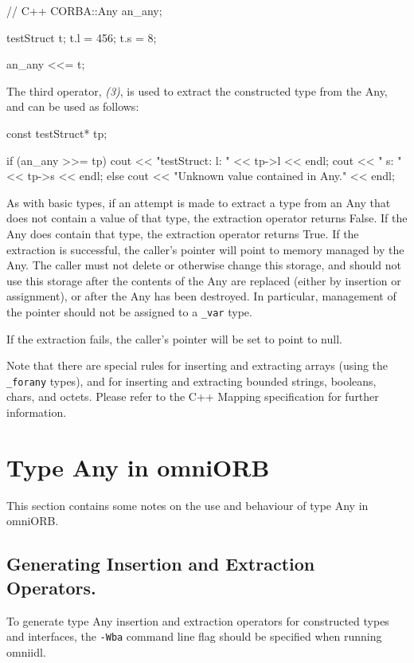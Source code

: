 \documentclass[11pt,twoside,a4paper]{book}
\newcommand{\type}[1]{\texttt{#1}}
\begin{document}
\begin{cxxlisting}
// C++
CORBA::Any an_any;

testStruct t;
t.l = 456;
t.s = 8;

an_any <<= t;
\end{cxxlisting}


The third operator, \emph{(3)}, is used to extract the constructed
type from the Any, and can be used as follows:

\begin{cxxlisting}
const testStruct* tp;

if (an_any >>= tp) {
    cout << "testStruct: l: " << tp->l << endl;
    cout << "            s: " << tp->s << endl;
}
else {
    cout << "Unknown value contained in Any." << endl;
}
\end{cxxlisting}

As with basic types, if an attempt is made to extract a type from an
Any that does not contain a value of that type, the extraction
operator returns False. If the Any does contain that type, the
extraction operator returns True. If the extraction is successful, the
caller's pointer will point to memory managed by the Any. The caller
must not delete or otherwise change this storage, and should not use
this storage after the contents of the Any are replaced (either by
insertion or assignment), or after the Any has been destroyed. In
particular, management of the pointer should not be assigned to a
\type{\_var} type.

If the extraction fails, the caller's pointer will be set to point to
null.

Note that there are special rules for inserting and extracting arrays
(using the \type{\_forany} types), and for inserting and extracting
bounded strings, booleans, chars, and octets. Please refer to the C++
Mapping specification for further information.



\section{Type Any in omniORB}
\label{anyOmniORB}

This section contains some notes on the use and behaviour of type Any
in omniORB.

\subsection{Generating Insertion and Extraction Operators.}
To generate type Any insertion and extraction operators for
constructed types and interfaces, the \texttt{-Wba} command line flag
should be specified when running omniidl.
\end{document}
